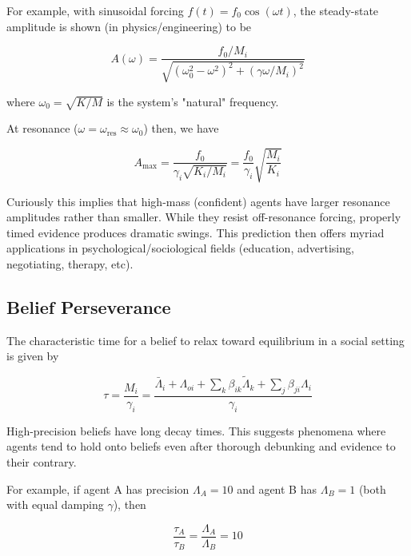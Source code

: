 \documentclass[12pt]{article}
\begin{document}
For example, with sinusoidal forcing $f(t) = f_0\cos(\omega t)$, the steady-state amplitude is shown (in physics/engineering) to be

\begin{equation}
A(\omega) = \frac{f_0/M_i}{\sqrt{(\omega_0^2 - \omega^2)^2 + (\gamma\omega/M_i)^2}}
\end{equation}

where $\omega_0 = \sqrt{K/M}$ is the system's "natural" frequency.

At resonance ($\omega = \omega_{\text{res}} \approx \omega_0$) then, we have

\begin{equation}
A_{\text{max}} = \frac{f_0}{\gamma_i \sqrt{K_i/M_i}} = \frac{f_0}{\gamma_i}\sqrt{\frac{M_i}{K_i}}
\end{equation}

Curiously this implies that high-mass (confident) agents have larger resonance amplitudes rather than smaller. While they resist off-resonance forcing, properly timed evidence produces dramatic swings. This prediction then offers myriad applications in psychological/sociological fields (education, advertising, negotiating, therapy, etc).


\subsection{Belief Perseverance}

The characteristic time for a belief to relax toward equilibrium in a social setting is given by

\begin{equation}
\boxed{\tau = \frac{M_i}{\gamma_i} = \frac{\bar{\Lambda}_i + \Lambda_{oi}+ \sum_k\beta_{ik}\tilde{\Lambda}_k + \sum_j\beta_{ji}\Lambda_i}{\gamma_i}}
\end{equation}


High-precision beliefs have long decay times. This suggests phenomena where agents tend to hold onto beliefs even after thorough debunking and evidence to their contrary.

For example, if agent A has precision $\Lambda_A = 10$ and agent B has $\Lambda_B = 1$ (both with equal damping $\gamma$), then

\begin{equation}
\frac{\tau_A}{\tau_B} = \frac{\Lambda_A}{\Lambda_B} = 10
\end{equation}
\end{document}
